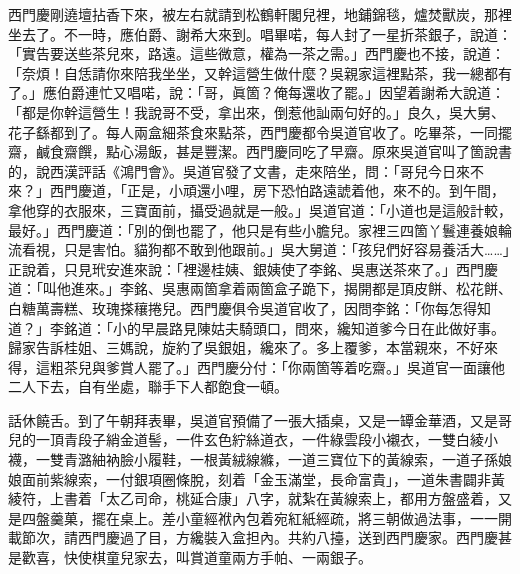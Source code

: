 西門慶剛遶壇拈香下來，被左右就請到松鶴軒閣兒裡，地鋪錦毯，爐焚獸炭，那裡坐去了。不一時，應伯爵、謝希大來到。唱畢喏，每人封了一星折茶銀子，說道：「實告要送些茶兒來，路遠。這些微意，權為一茶之需。」西門慶也不接，說道：「奈煩！自恁請你來陪我坐坐，又幹這營生做什麼？吳親家這裡點茶，我一總都有了。」應伯爵連忙又唱喏，說：「哥，眞箇？俺每還收了罷。」因望着謝希大說道：「都是你幹這營生！我說哥不受，拿出來，倒惹他訕兩句好的。」{}良久，吳大舅、花子繇都到了。每人兩盒細茶食來點茶，西門慶都令吳道官收了。吃畢茶，一同擺齋，鹹食齋饌，點心湯飯，甚是豐潔。西門慶同吃了早齋。原來吳道官叫了箇說書的，說西漢評話《鴻門會》。{}吳道官發了文書，走來陪坐，問：「哥兒今日來不來？」西門慶道，「正是，小頑還小哩，房下恐怕路遠諕着他，來不的。到午間，拿他穿的衣服來，三寶面前，攝受過就是一般。」吳道官道：「小道也是這般計較，最好。」西門慶道：「別的倒也罷了，他只是有些小膽兒。家裡三四箇丫鬟連養娘輪流看視，只是害怕。貓狗都不敢到他跟前。」{}吳大舅道：「孩兒們好容易養活大……」正說着，只見玳安進來說：「裡邊桂姨、銀姨使了李銘、吳惠送茶來了。」西門慶道：「叫他進來。」李銘、吳惠兩箇拿着兩箇盒子跪下，揭開都是頂皮餅、松花餅、白糖萬壽糕、玫瑰搽穰捲兒。西門慶俱令吳道官收了，因問李銘：「你每怎得知道？」李銘道：「小的早晨路見陳姑夫騎頭口，問來，纔知道爹今日在此做好事。歸家告訴桂姐、三媽說，旋約了吳銀姐，纔來了。多上覆爹，本當親來，不好來得，這粗茶兒與爹賞人罷了。」西門慶分付：「你兩箇等着吃齋。」吳道官一面讓他二人下去，自有坐處，聯手下人都飽食一頓。

話休饒舌。到了午朝拜表畢，吳道官預備了一張大插桌，又是一罈金華酒，又是哥兒的一頂青段子綃金道髻，一件玄色紵絲道衣，一件綠雲段小襯衣，一雙白綾小襪，一雙青潞紬衲臉小履鞋，一根黃絨線縧，一道三寶位下的黃線索，一道子孫娘娘面前紫線索，一付銀項圈條脫，刻着「金玉滿堂，長命富貴」，一道朱書闢非黃綾符，上書着「太乙司命，桃延合康」八字，就紮在黃線索上，都用方盤盛着，又是四盤羹菓，擺在桌上。差小童經袱內包着宛紅紙經疏，將三朝做過法事，一一開載節次，請西門慶過了目，方纔裝入盒担內。共約八擡，送到西門慶家。西門慶甚是歡喜，快使棋童兒家去，叫賞道童兩方手帕、一兩銀子。

